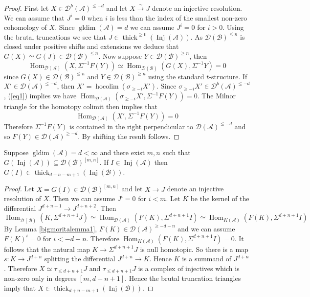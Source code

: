 \documentclass[12pt,oneside]{amsart}
\DeclareMathOperator*{\Inj}{Inj}
\DeclareMathOperator*{\hocolim}{hocolim}
\DeclareMathOperator{\Hom}{Hom}
\DeclareMathOperator{\thick}{thick}
\DeclareMathOperator{\gldim}{gldim}
\begin{document}
\begin{proof}
First let $X \in \mathcal{D}^b(\mathcal{A})^{\leq -d}$ and let $X \xrightarrow{\sim} J$ denote an injective resolution. We can assume that $J^i = 0$ when $i$ is less than the index of the smallest non-zero cohomology of $X$. Since $\gldim(\mathcal{A}) = d$ we can assume $J^i = 0$ for $i > 0$. Using the brutal truncations we see that $J \in \thick^{\geq 0}(\Inj(\mathcal{A}))$. As $\mathcal{D}(\mathcal{B})^{\leq n}$ is closed under positive shifts and extensions we deduce that $G(X) \simeq G(J) \in \mathcal{D}(\mathcal{B})^{\leq n}$. Now suppose $Y \in \mathcal{D}(\mathcal{B})^{\geq n}$, then 
\begin{equation} \label{eq1}
\Hom_{\mathcal{D}(\mathcal{A})}(X, \Sigma^{-1} F(Y)) \simeq \Hom_{\mathcal{D}(\mathcal{B})}(G(X),\Sigma^{-1} Y) = 0
\end{equation}
since $G(X) \in \mathcal{D}(\mathcal{B})^{\leq n}$ and $Y \in \mathcal{D}(\mathcal{B})^{\geq n}$ using the standard $t$-structure. If $X' \in \mathcal{D}(\mathcal{A})^{\leq -d}$, then $X' = \hocolim(\sigma_{\geq -i} X')$. Since $\sigma_{\geq -i} X' \in \mathcal{D}^b(\mathcal{A})^{\leq -d}$, (\ref{eq1}) implies we have $\Hom_{\mathcal{D}(\mathcal{A})}(\sigma_{\geq -i} X', \Sigma^{-1} F(Y)) =0$. The Milnor triangle for the homotopy colimit then implies that  
\[
\Hom_{\mathcal{D}(\mathcal{A})}(X',\Sigma^{-1}F(Y)) = 0
\]
Therefore $\Sigma^{-1}F(Y)$ is contained in the right perpendicular to $\mathcal{D}(\mathcal{A})^{\leq - d}$ and so $F(Y) \in \mathcal{D}(\mathcal{A})^{ \geq -d}$. By shifting the result follows.
\end{proof}

\begin{lemma}\label{bigmoritalemma2}
Suppose $\gldim(\mathcal{A}) = d < \infty$ and there exist $m,n$ such that $G(\Inj(\mathcal{A})) \subseteq \mathcal{D}(\mathcal{B})^{[m,n]}$. If $I \in \Inj(\mathcal{A})$ then $G(I) \in \thick_{d+n-m+1}(\Inj(\mathcal{B}))$.
\end{lemma}

\begin{proof}
Let $X = G(I) \in \mathcal{D}(\mathcal{B})^{[m,n]}$ and let $X \to J$ denote an injective resolution of $X$. Then we can assume $J^i = 0$ for $i < m$. Let $K$ be the kernel of the differential $J^{d+n+1} \to J^{d+n+2}$. Then 
\[
\Hom_{\mathcal{D}(\mathcal{B})}(K, \Sigma^{d+n+1} J) \simeq \Hom_{\mathcal{D}(\mathcal{A})}(F(K), \Sigma^{d+n+1} I) \simeq \Hom_{K(\mathcal{A})}(F(K), \Sigma^{d+n+1} I)
\]
By Lemma \ref{bigmoritalemma1}, $F(K) \in \mathcal{D}(\mathcal{A})^{\geq -d-n}$ and we can assume $F(K)^i = 0$ for $i<-d-n$. Therefore $\Hom_{K(\mathcal{A})}(F(K), \Sigma^{d+n+1} I) = 0$. It follows that the natural map $K \to \Sigma^{d+n+1} J$ is null homotopic. So there is a map $s: K \to J^{d+n}$ splitting the differential $J^{d+n} \to K$. Hence $K$ is a summand of $J^{d+n}$. Therefore $X \simeq \tau_{\leq d + n + 1} J$ and $\tau_{\leq d + n + 1} J$ is a complex of injectives which is non-zero only in degrees $[m, d + n +1]$. Hence the brutal truncation triangles imply that $X \in \thick_{d+n-m+1}(\Inj(\mathcal{B}))$. 
\end{proof}
\end{document}
